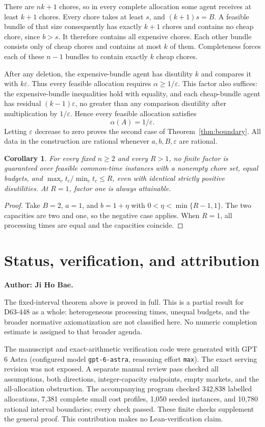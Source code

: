 \documentclass[11pt]{article}
\newtheorem{corollary}[theorem]{Corollary}
\begin{document}
There are $nk+1$ chores, so in every complete allocation some agent receives
at least $k+1$ chores. Every chore takes at least $s$, and $(k+1)s=B$.
A feasible bundle of that size consequently has exactly $k+1$ chores and
contains no cheap chore, since $b>s$. It therefore contains all expensive
chores. Each other bundle consists only of cheap chores and contains at most
$k$ of them. Completeness forces each of these $n-1$ bundles to contain
exactly $k$ cheap chores.

After any deletion, the expensive-bundle agent has disutility $k$ and compares
it with $k\varepsilon$. Thus every feasible allocation requires
$\alpha\ge1/\varepsilon$. This factor also suffices: the expensive-bundle
inequalities hold with equality, and each cheap-bundle agent has residual
$(k-1)\varepsilon$, no greater than any comparison disutility after
multiplication by $1/\varepsilon$. Hence every feasible allocation satisfies
\[
                           \alpha(A)=1/\varepsilon.
\]
Letting $\varepsilon$ decrease to zero proves the second case of
Theorem~\ref{thm:boundary}. All data in the construction are rational whenever
$a,b,B,\varepsilon$ are rational.

\begin{corollary}
For every fixed $n\ge2$ and every $R>1$, no finite factor is guaranteed over
feasible common-time instances with a nonempty chore set, equal budgets, and
$\max_c t_c/\min_c t_c\le R$, even with identical strictly positive
disutilities. At $R=1$, factor one is always attainable.
\end{corollary}
\begin{proof}
Take $B=2$, $a=1$, and $b=1+\eta$ with
$0<\eta<\min\{R-1,1\}$. The two capacities are two and one, so the negative
case applies. When $R=1$, all processing times are equal and the capacities
coincide.
\end{proof}


\section*{Status, verification, and attribution}
\noindent\textbf{Author: Ji Ho Bae.}

The fixed-interval theorem above is proved in full. This is a partial result
for D63-448 as a whole: heterogeneous processing times, unequal budgets,
and the broader normative axiomatization are not classified here.
No numeric completion estimate is assigned to that broader agenda.

The manuscript and exact-arithmetic verification code were generated with
GPT 6 Astra (configured model \texttt{gpt-6-astra}, reasoning effort
\texttt{max}). The exact serving revision was not exposed.
A separate manual review pass checked all assumptions, both directions,
integer-capacity endpoints, empty markets, and the all-allocation obstruction.
The accompanying program checked 342,838 labelled allocations, 7,381 complete
small cost profiles, 1,050 seeded instances, and 10,780 rational interval
boundaries; every check passed. These finite checks supplement the general
proof. This contribution makes no Lean-verification claim.
\end{document}
